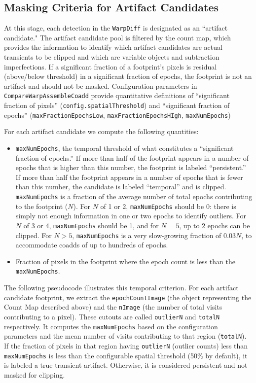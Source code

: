 \documentclass[DM,authoryear,toc]{lsstdoc}
\begin{document}
\subsection{Masking Criteria for Artifact Candidates}
\label{sec:criteria}

At this stage, each detection in the \texttt{WarpDiff} is designated as an ``artifact candidate."
The artifact candidate pool is filtered by the count map, which provides the information to identify which artifact candidates are actual transients to be clipped and which are variable objects and subtraction imperfections.
If a significant fraction of a footprint's pixels is residual (above/below threshold) in a significant fraction of epochs, the footprint is not an artifact and should not be masked.
Configuration parameters in \texttt{CompareWarpAssembleCoadd} provide quantitative definitions of ``significant fraction of pixels''   (\texttt{config.spatialThreshold}) and ``significant fraction of epochs'' (\texttt{maxFractionEpochsLow}, \texttt{maxFractionEpochsHIgh}, \texttt{maxNumEpochs})

For each artifact candidate we compute the following quantities:
\begin{itemize}
\item \texttt{maxNumEpochs}, the temporal threshold of what constitutes a ``significant fraction of epochs.''
If more than half of the footprint appears in a number of epochs that is higher than this number, the footprint is labeled ``persistent.''
 If more than half the footprint appears in a number of epochs that is fewer than this number, the candidate is labeled ``temporal'' and is clipped.
 \texttt{maxNumEpochs} is a fraction of the average number of total epochs contributing to the footprint ($N$). For $N$ of 1 or 2, \texttt{maxNumEpochs} should be 0:  there is simply not enough information in one or two epochs to identify outliers.
For $N$ of 3 or 4, \texttt{maxNumEpochs} should be 1, and for $N=5$, up to 2 epochs can be clipped. For $N>5$,  \texttt{maxNumEpochs} is a very slow-growing fraction of $0.03N$, to accommodate coadds of up to hundreds of epochs.
\item  Fraction of pixels in the footprint where the epoch count is less than the \texttt{maxNumEpochs}.
\end{itemize}

The following pseudocode illustrates this temporal criterion.
For each artifact candidate footprint, we extract the \texttt{epochCountImage} (the object representing the Count Map described above) and the \texttt{nImage} (the number of total visits contributing to a pixel).
These cutouts are called \texttt{outlierN} and \texttt{totalN} respectively.
It computes the \texttt{maxNumEpochs} based on the configuration parameters and the mean number of visits contributing to that region (\texttt{totalN}).
If the fraction of pixels in that region having \texttt{outlierN} (outlier counts) less than  \texttt{maxNumEpochs} is less than the configurable spatial threshold (50\% by default), it is labeled a true transient artifact.
Otherwise, it is considered persistent and not masked for clipping.
\end{document}
